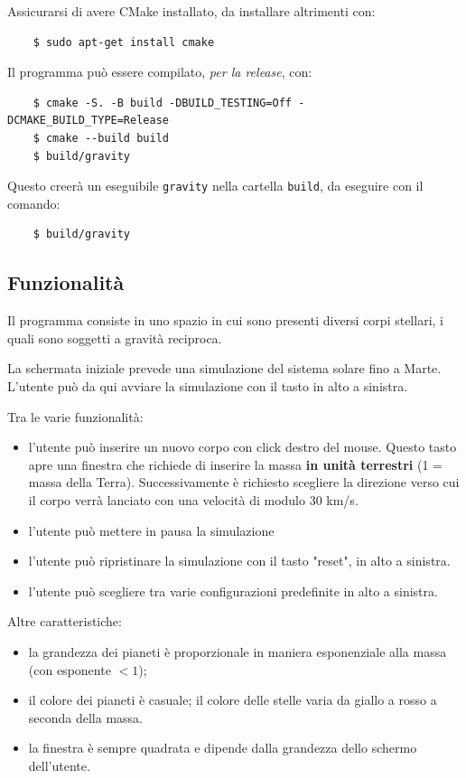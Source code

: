\documentclass{article}
\begin{document}
Assicurarsi di avere CMake installato, da installare altrimenti con:
\begin{verbatim}
    $ sudo apt-get install cmake
\end{verbatim}

Il programma può essere compilato, \textit{per la release}, con:
\begin{verbatim}
    $ cmake -S. -B build -DBUILD_TESTING=Off -DCMAKE_BUILD_TYPE=Release
    $ cmake --build build
    $ build/gravity
     \end{verbatim}

Questo creerà un eseguibile \verb|gravity| nella cartella \verb|build|, da eseguire con il comando:
\begin{verbatim}
    $ build/gravity
\end{verbatim}

\subsection{Funzionalità}
Il programma consiste in uno spazio in cui sono presenti diversi corpi stellari, i quali sono soggetti a gravità reciproca.

La schermata iniziale prevede una simulazione del sistema solare fino a Marte. L'utente può da qui avviare la simulazione con il tasto in alto a sinistra. 

Tra le varie funzionalità:
\begin{itemize}
    \item l'utente può inserire un nuovo corpo con click destro del mouse. Questo tasto apre una finestra che richiede di inserire la massa \textbf{in unità terrestri} (1 = massa della Terra). Successivamente è richiesto scegliere la direzione verso cui il corpo verrà lanciato con una velocità di modulo 30 km/s.
    \item l'utente può mettere in pausa la simulazione
    \item l'utente può ripristinare la simulazione con il tasto "reset", in alto a sinistra.
    \item l'utente può scegliere tra varie configurazioni predefinite in alto a sinistra.
\end{itemize}

Altre caratteristiche:
\begin{itemize}
    \item la grandezza dei pianeti è proporzionale in maniera esponenziale alla massa (con esponente $< 1$);
    \item il colore dei pianeti è casuale; il colore delle stelle varia da giallo a rosso a seconda della massa.
    \item la finestra è sempre quadrata e dipende dalla grandezza dello schermo dell'utente.
\end{itemize}
\end{document}
